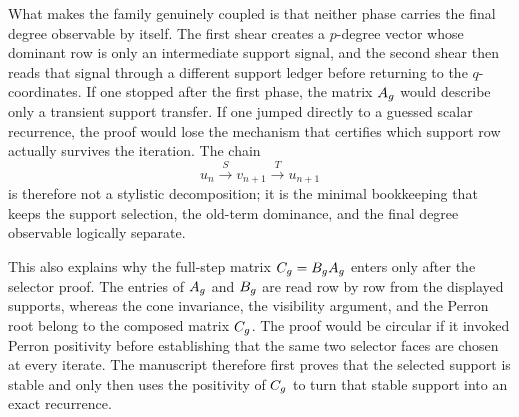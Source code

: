 \documentclass[11pt]{article}
\theoremstyle{remark}
\numberwithin{equation}{section}
\begin{document}
What makes the family genuinely coupled is that neither phase carries the final
degree observable by itself.  The first shear creates a \(p\)-degree vector
whose dominant row is only an intermediate support signal, and the second shear
then reads that signal through a different support ledger before returning to
the \(q\)-coordinates.  If one stopped after the first phase, the matrix
\(A_g\) would describe only a transient support transfer.  If one jumped
directly to a guessed scalar recurrence, the proof would lose the mechanism
that certifies which support row actually survives the iteration.  The chain
\[
u_n \xrightarrow{\;S\;} v_{n+1} \xrightarrow{\;T\;} u_{n+1}
\]
is therefore not a stylistic decomposition; it is the minimal bookkeeping that
keeps the support selection, the old-term dominance, and the final degree
observable logically separate.

This also explains why the full-step matrix \(C_g=B_gA_g\) enters only after
the selector proof.  The entries of \(A_g\) and \(B_g\) are read row by row
from the displayed supports, whereas the cone invariance, the visibility
argument, and the Perron root belong to the composed matrix \(C_g\).  The proof
would be circular if it invoked Perron positivity before establishing that the
same two selector faces are chosen at every iterate.  The manuscript therefore
first proves that the selected support is stable and only then uses the
positivity of \(C_g\) to turn that stable support into an exact recurrence.
\end{document}
